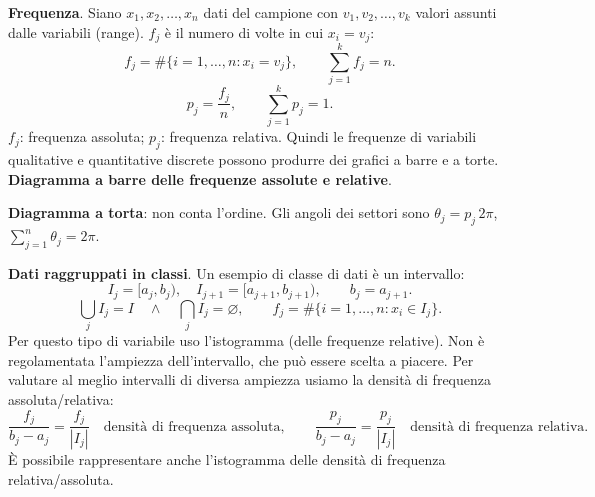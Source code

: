 \documentclass[11pt,a4paper]{article}
\newcommand{\pagina}[1]{\clearpage}
\begin{document}
\textbf{Frequenza}. Siano $x_1,x_2,\ldots,x_n$ dati del campione con $v_1,v_2,\ldots,v_k$ valori assunti dalle variabili (range). $f_j$ è il numero di volte in cui $x_i=v_j$:
\[f_j=\#\{i=1,\ldots,n:x_i=v_j\},\qquad\sum_{j=1}^k f_j=n.\]
\[p_j=\frac{f_j}{n},\qquad\sum_{j=1}^k p_j=1.\]
$f_j$: frequenza assoluta; $p_j$: frequenza relativa. Quindi le frequenze di variabili qualitative e quantitative discrete possono produrre dei grafici a barre e a torte.
\pagina{3}\textbf{Diagramma a barre delle frequenze assolute e relative}.
\begin{center}\end{center}
\textbf{Diagramma a torta}: non conta l'ordine. Gli angoli dei settori sono $\theta_j=p_j\,2\pi$, $\sum_{j=1}^n\theta_j=2\pi$.
\begin{center}\end{center}
\textbf{Dati raggruppati in classi}. Un esempio di classe di dati è un intervallo:
\[I_j=[a_j,b_j),\quad I_{j+1}=[a_{j+1},b_{j+1}),\qquad b_j=a_{j+1}.\]
\[\bigcup_j I_j=I\quad\land\quad\bigcap_j I_j=\varnothing,\qquad f_j=\#\{i=1,\ldots,n:x_i\in I_j\}.\]
Per questo tipo di variabile uso l'istogramma (delle frequenze relative).
\pagina{4}Non è regolamentata l'ampiezza dell'intervallo, che può essere scelta a piacere. Per valutare al meglio intervalli di diversa ampiezza usiamo la densità di frequenza assoluta/relativa:
\[\frac{f_j}{b_j-a_j}=\frac{f_j}{|I_j|}\quad\text{densità di frequenza assoluta},\qquad\frac{p_j}{b_j-a_j}=\frac{p_j}{|I_j|}\quad\text{densità di frequenza relativa}.\]
È possibile rappresentare anche l'istogramma delle densità di frequenza relativa/assoluta.
\end{document}
